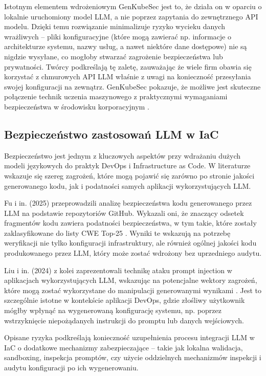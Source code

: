 Istotnym elementem wdrożeniowym GenKubeSec jest to, że działa on w oparciu o lokalnie uruchomiony model LLM, a nie poprzez zapytania do zewnętrznego API modelu. Dzięki temu rozwiązanie minimalizuje ryzyko wycieku danych wrażliwych – pliki konfiguracyjne (które mogą zawierać np. informacje o architekturze systemu, nazwy usług, a nawet niektóre dane dostępowe) nie są nigdzie wysyłane, co mogłoby stwarzać zagrożenie bezpieczeństwa lub prywatności. Twórcy podkreślają tę zaletę, zauważając że wiele firm obawia się korzystać z chmurowych API LLM właśnie z uwagi na konieczność przesyłania swojej konfiguracji na zewnątrz. GenKubeSec pokazuje, że możliwe jest skuteczne połączenie technik uczenia maszynowego z praktycznymi wymaganiami bezpieczeństwa w środowisku korporacyjnym \cite{malul_genkubesec_2024}.

\subsection{Bezpieczeństwo zastosowań LLM w IaC}

Bezpieczeństwo jest jednym z kluczowych aspektów przy wdrażaniu dużych modeli językowych do praktyk DevOps i Infrastructure as Code. W literaturze wskazuje się szereg zagrożeń, które mogą pojawić się zarówno po stronie jakości generowanego kodu, jak i podatności samych aplikacji wykorzystujących LLM.

Fu i in. (2025) przeprowadzili analizę bezpieczeństwa kodu generowanego przez LLM na podstawie repozytoriów GitHub. Wykazali oni, że znaczący odsetek fragmentów kodu zawiera podatności bezpieczeństwa, w tym takie, które zostały zaklasyfikowane do listy CWE Top-25 \cite{fu_security_2025}. Wyniki te wskazują na potrzebę weryfikacji nie tylko konfiguracji infrastruktury, ale również ogólnej jakości kodu produkowanego przez LLM, który może zostać wdrożony bez uprzedniego audytu.

Liu i in. (2024) z kolei zaprezentowali technikę ataku prompt injection w aplikacjach wykorzystujących LLM, wskazując na potencjalne wektory zagrożeń, które mogą zostać wykorzystane do manipulacji generowanymi wynikami \cite{liu_prompt_2024}. Jest to szczególnie istotne w kontekście aplikacji DevOps, gdzie złośliwy użytkownik mógłby wpłynąć na wygenerowaną konfigurację systemu, np. poprzez wstrzyknięcie niepożądanych instrukcji do promptu lub danych wejściowych.

Opisane ryzyka podkreślają konieczność uzupełnienia procesu integracji LLM w IaC o dodatkowe mechanizmy zabezpieczające – takie jak lokalna walidacja, sandboxing, inspekcja promptów, czy użycie oddzielnych mechanizmów inspekcji i audytu konfiguracji po ich wygenerowaniu.

